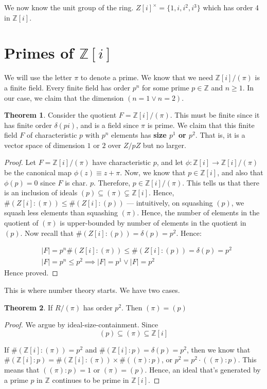 \documentclass{book}
\newcommand{\Z}{\ensuremath{\mathbb{Z}}}
\theoremstyle{definition}
\newtheorem{theorem}{Theorem}
\begin{document}
We now know the unit group of the ring. $Z[i]^\times = \{ 1, i, i^2, i^3 \}$
which has order 4 in $\Z[i]$.

\section{Primes of $\Z[i]$}

We will use the letter $\pi$ to denote a prime. We know that we need $\Z[i] / (\pi)$
is a finite field. Every finite field has order $p^n$ for some prime $p \in \Z$
and $n \geq 1$. In our case, we claim that the dimension $(n = 1 \lor n = 2)$.
\begin{theorem}
Consider the quotient $F = \Z[i]/ (\pi)$. This must be finite since it has finite order $\delta(pi)$,
and is a field since $\pi$ is prime. We claim that this finite field $F$ of
characteristic $p$ with $p^n$ elements has \textbf{size $p^1$ or $p^2$}. That is,
it is a vector space of dimension $1$ or $2$ over $Z/pZ$ but no larger.
\end{theorem}
\begin{proof}
Let $F = \Z[i]/(\pi)$ have characteristic $p$, and let $\phi: \Z[i] \rightarrow \Z[i]/(\pi)$
be the canonical map $\phi(z) \equiv z + \pi$. Now, we know that $p \in \Z[i]$,
and also that $\phi(p) = 0$ since $F$ is char. $p$. Therefore, $p \in \Z[i]/(\pi)$.
This tells us that there is an inclusion of ideals $(p) \subseteq (\pi) \subsetneq \Z[i]$.
Hence, $\#(Z[i]:(\pi)) \leq \#(Z[i]:(p))$ --- intuitively, on squashing $(p)$,
we squash less elements than squashing $(\pi)$. Hence, the number of elements
in the quotient of $(\pi)$ is upper-bounded by number of elements in the
quotient in $(p)$. Now recall that $\#(Z[i]:(p)) = \delta(p) = p^2$. Hence:

\begin{align*}
&|F| = p^n \#(Z[i]:(\pi)) \leq \#(Z[i]:(p)) = \delta(p) = p^2 \\
&|F| = p^n \leq p^2 \implies |F| = p^1 \lor |F| = p^2
\end{align*}
Hence proved.
\end{proof}

This is where number theory starts. We have two cases. 

\begin{theorem}
If $R/(\pi)$ has order $p^2$. Then $(\pi) = (p)$
\end{theorem}
\begin{proof}
We argue by ideal-size-containment. Since 
$$
(p) \subseteq (\pi) \subseteq \Z[i]
$$

If $\#(\Z[i]:(\pi)) = p^2$ and $\#(\Z[i]:p) = \delta(p) = p^2$, then we know
that $\#(\Z[i]:p) = \#(\Z[i]:(\pi)) \times \#((\pi):p)$, or $p^2 = p^2 \cdot ((\pi):p)$.
This means that $((\pi):p) = 1$ or $(\pi) = (p)$. Hence, an ideal that's generated
by a prime $p$ in $\Z$ continues to be prime in $\Z[i]$.
\end{proof}
\end{document}
